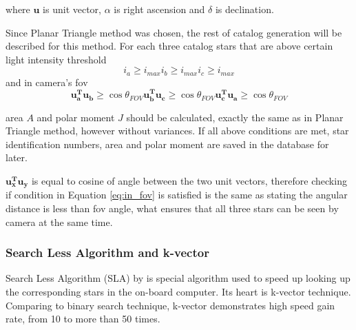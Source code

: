 \documentclass[12pt,a4paper,twoside]{article}
\begin{document}
where $\bm{u}$ is unit vector, $\alpha$ is right ascension and $\delta$ is declination.

Since Planar Triangle method was chosen, the rest of catalog generation will be described for this method. For each three catalog stars that are above certain light intensity threshold
\begin{subequations}
\begin{equation}
i_a \geq i_{max}
\end{equation}
\begin{equation}
i_b \geq i_{max}
\end{equation}
\begin{equation}
i_c \geq i_{max}
\end{equation}
\end{subequations}
and in camera's \gls{fov}
\begin{subequations}
\begin{equation}
\bm{u_a^T u_b} \geq \cos \theta_{FOV}
\end{equation}
\begin{equation}
\bm{u_b^T u_c} \geq \cos \theta_{FOV}
\end{equation}
\begin{equation}
\bm{u_c^T u_a} \geq \cos \theta_{FOV}
\end{equation}
\label{eq:in_fov}
\end{subequations}

area $A$ and polar moment $J$ should be calculated, exactly the same as in Planar Triangle method, however without variances. If all above conditions are met, star identification numbers, area and polar moment are saved in the database for later.

$\bm{u_x^T u_y}$ is equal to cosine of angle between the two unit vectors, therefore checking if condition in Equation \ref{eq:in_fov} is satisfied is the same as stating the angular distance is less than \gls{fov} angle, what ensures that all three stars can be seen by camera at the same time.

\subsubsection{Search Less Algorithm and k-vector}

Search Less Algorithm (SLA) by \citet{mortari1996fast} is special algorithm used to speed up looking up the corresponding stars in the on-board computer. Its heart is k-vector technique. Comparing to binary search technique, k-vector demonstrates high speed gain rate, from 10 to more than 50 times\cite{mortari2000k}.
\end{document}
